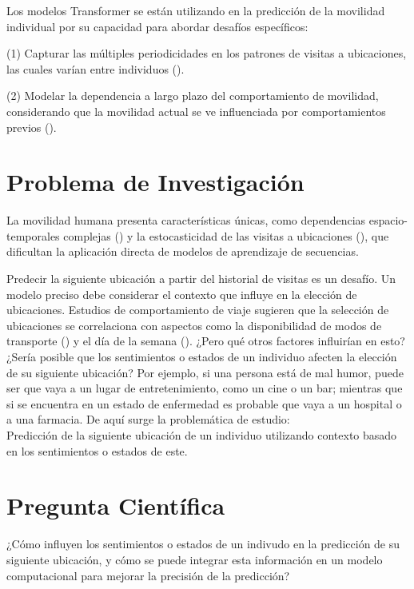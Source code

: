 Los modelos Transformer se están utilizando en la predicción de la 
movilidad individual por su capacidad para abordar desafíos 
específicos: 

(1) Capturar las múltiples periodicidades en los 
patrones de visitas a ubicaciones, las cuales varían entre 
individuos (\cite{feng2018deepmove}). 

(2) Modelar la dependencia a largo plazo del 
comportamiento de movilidad, considerando que la movilidad actual 
se ve influenciada por comportamientos previos (\cite{Cherchi2017,Sun2013}).

\section{Problema de Investigación}

La movilidad humana presenta características únicas, como 
dependencias espacio-temporales complejas (\cite{feng2018deepmove,li2020hierarchical}) y la 
estocasticidad de las visitas a ubicaciones (\cite{Song2010}), que 
dificultan la aplicación directa de modelos de aprendizaje de 
secuencias. 

Predecir la siguiente ubicación a partir del 
historial de visitas es un desafío. Un modelo preciso debe 
considerar el contexto que influye en la elección de ubicaciones.  
Estudios de comportamiento de viaje sugieren que la selección de 
ubicaciones se correlaciona con aspectos como la disponibilidad 
de modos de transporte (\cite{Hong_2022}) y el día de la semana (\cite{Dharmowijoyo2016}). 
¿Pero qu\'e otros factores influir\'ian en esto? ¿Ser\'ia posible
que los sentimientos o estados de un individuo afecten la elección
de su siguiente ubicación? Por ejemplo, si una persona
está de mal humor, puede ser que vaya a un lugar
de entretenimiento, como un cine o un bar; mientras que si
se encuentra en un estado de enfermedad es probable que
vaya a un hospital o a una farmacia. De aqu\'i surge la
problem\'atica de estudio:\\

Predicci\'on de la siguiente ubicación de un individuo utilizando contexto
basado en los sentimientos o estados de este.

\section{Pregunta Científica}

¿Cómo influyen los sentimientos o estados de un indivudo en 
la predicción de su siguiente 
ubicación, y cómo se puede integrar esta 
información en un modelo computacional para mejorar la 
precisión de la predicción?


